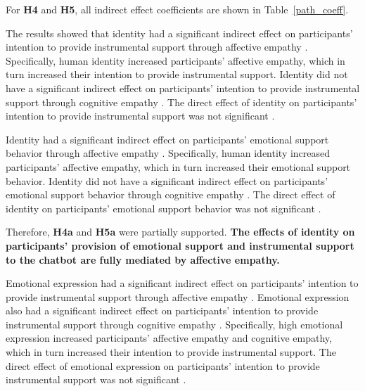 For \textbf{H4} and \textbf{H5}, all indirect effect coefficients are shown in Table~\ref{path_coeff}.

The results showed that identity had a significant indirect effect on participants' intention to provide instrumental support through affective empathy . Specifically, human identity increased participants' affective empathy, which in turn increased their intention to provide instrumental support. 
Identity did not have a significant indirect effect on participants' intention to provide instrumental support through cognitive empathy . 
The direct effect of identity on participants' intention to provide instrumental support was not significant .

Identity had a significant indirect effect on participants' emotional support behavior through affective empathy . Specifically, human identity increased participants' affective empathy, which in turn increased their emotional support behavior. Identity did not have a significant indirect effect on participants' emotional support behavior through cognitive empathy . The direct effect of identity on participants' emotional support behavior was not significant .


Therefore, \textbf{H4a} and \textbf{H5a} were partially supported. 
\textbf{The effects of identity on participants' provision of emotional support and instrumental support to the chatbot are fully mediated by affective empathy. }

Emotional expression had a significant indirect effect on participants' intention to provide instrumental support through affective empathy . Emotional expression also had a significant indirect effect on participants' intention to provide instrumental support through cognitive empathy . Specifically, high emotional expression increased participants' affective empathy and cognitive empathy, which in turn increased their intention to provide instrumental support. 
The direct effect of emotional expression on participants' intention to provide instrumental support was not significant .

